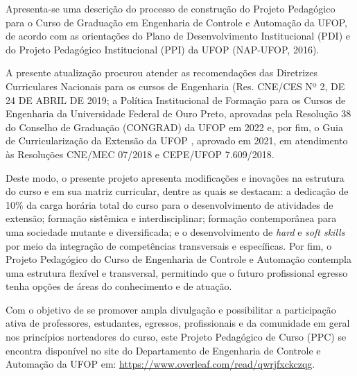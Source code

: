 \documentclass[
	12pt,				%
	openright,			%
	oneside,			%
	a4paper,			%
	english,			%
	brazil				%
	]{abntex2}
\begin{document}
Apresenta-se uma descrição do processo de construção do Projeto  Pedagógico para o Curso de Graduação em Engenharia de Controle e Automação da  UFOP, de acordo com as orientações do Plano de Desenvolvimento Institucional (PDI) e  do Projeto Pedagógico Institucional (PPI) da UFOP (NAP-UFOP, 2016).

A presente atualização procurou atender as recomendações das Diretrizes Curriculares Nacionais para os cursos de Engenharia (Res. CNE/CES Nº 2, DE 24 DE ABRIL DE 2019; a Política Institucional de Formação para os Cursos de Engenharia da Universidade Federal de Ouro Preto, aprovadas  pela Resolução 38 do Conselho de Graduação (CONGRAD) da UFOP em 2022 e, por fim, o Guia de Curricularização da Extensão da UFOP , aprovado em 2021, em atendimento às  Resoluções CNE/MEC 07/2018 e CEPE/UFOP 7.609/2018.

Deste modo, o presente projeto apresenta modificações e inovações na estrutura do curso e em sua matriz curricular, dentre as quais se destacam: a dedicação de 10\% da  carga  horária total do curso para o desenvolvimento de atividades de extensão; formação sistêmica e interdisciplinar; formação  contemporânea para uma sociedade mutante e diversificada; e o desenvolvimento de \textit{hard} e \textit{soft skills} por meio da integração de competências transversais e específicas. Por fim, o Projeto Pedagógico do Curso de Engenharia de Controle e Automação contempla uma estrutura flexível e transversal, permitindo que o futuro profissional egresso tenha opções de áreas do conhecimento e de atuação.

Com o objetivo de se promover ampla divulgação e possibilitar a participação ativa de  professores, estudantes, egressos, profissionais e da comunidade em geral nos princípios  norteadores do curso, este Projeto Pedagógico de Curso (PPC) se encontra disponível no site do Departamento de Engenharia de Controle e Automação da UFOP em: \url{https://www.overleaf.com/read/qwrjfxckczqg}.

\end{document}
